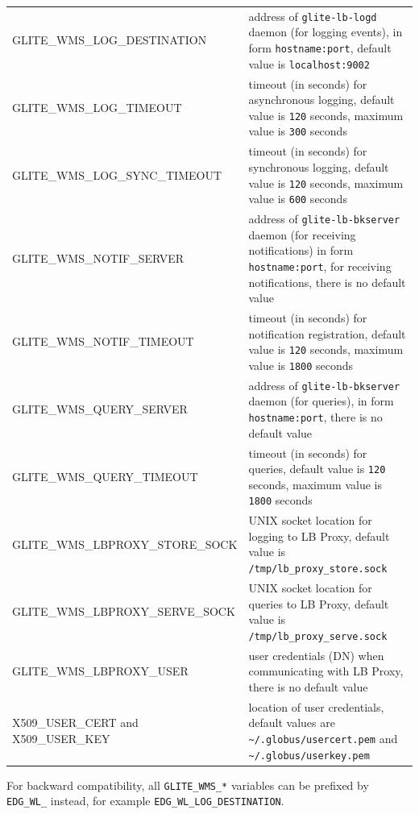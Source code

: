 \begin{tabularx}{\textwidth}{lX}
GLITE\_WMS\_LOG\_DESTINATION & 
   address of \verb'glite-lb-logd' daemon (for logging events), 
   in form \verb'hostname:port',
   default value is \verb'localhost:9002' \\
GLITE\_WMS\_LOG\_TIMEOUT & 
   timeout (in seconds) for asynchronous logging, 
   default value is \verb'120' seconds, 
   maximum value is \verb'300' seconds \\
GLITE\_WMS\_LOG\_SYNC\_TIMEOUT & 
   timeout (in seconds) for synchronous logging, 
   default value is \verb'120' seconds, 
   maximum value is \verb'600' seconds \\
GLITE\_WMS\_NOTIF\_SERVER & 
   address of \verb'glite-lb-bkserver' daemon (for receiving notifications)
   in form \verb'hostname:port', for receiving notifications,
   there is no default value \\
GLITE\_WMS\_NOTIF\_TIMEOUT & 
   timeout (in seconds) for notification registration,
   default value is \verb'120' seconds,
   maximum value is \verb'1800' seconds \\
GLITE\_WMS\_QUERY\_SERVER & 
   address of \verb'glite-lb-bkserver' daemon (for queries), 
   in form \verb'hostname:port', 
   there is no default value \\
GLITE\_WMS\_QUERY\_TIMEOUT &
   timeout (in seconds) for queries,
   default value is \verb'120' seconds,
   maximum value is \verb'1800' seconds \\
GLITE\_WMS\_LBPROXY\_STORE\_SOCK &
   UNIX socket location for logging to LB Proxy,
   default value is \verb'/tmp/lb_proxy_store.sock' \\
GLITE\_WMS\_LBPROXY\_SERVE\_SOCK &
   UNIX socket location for queries to LB Proxy,
   default value is \verb'/tmp/lb_proxy_serve.sock' \\
GLITE\_WMS\_LBPROXY\_USER &
   user credentials (DN) when communicating with LB Proxy,  
   there is no default value \\
X509\_USER\_CERT and X509\_USER\_KEY & 
   location of user credentials,
   default values are \verb'~/.globus/usercert.pem' and \verb'~/.globus/userkey.pem' \\
\end{tabularx}

For backward compatibility, all \verb'GLITE_WMS_*' variables can be prefixed by
\verb'EDG_WL_' instead, for example \verb'EDG_WL_LOG_DESTINATION'.
